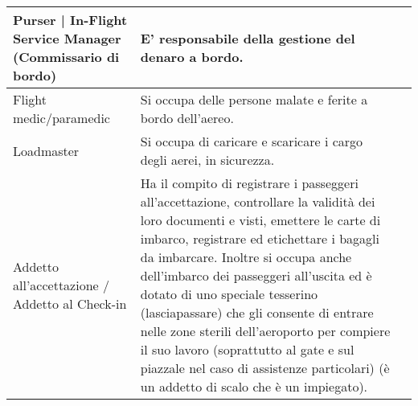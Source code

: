 \begin{landscape}
\begin{table}[htp]
{\begin{tabular}{p{}p{}p{}}
			\hline
			\textsf{\small Purser | In-Flight Service Manager (Commissario di bordo)} & \textsf{\small E' responsabile della gestione del denaro a bordo. } & \textsf{\small } \\
			\hline
			\textsf{\small Flight medic/paramedic} & \textsf{\small Si occupa delle persone malate e ferite a bordo dell'aereo.} & \textsf{\small } \\
			\hline
			\textsf{\small Loadmaster} & \textsf{\small Si occupa di caricare e scaricare i cargo degli aerei, in sicurezza.} & \textsf{\small } \\
			\hline
			\textsf{\small Addetto all'accettazione / Addetto al Check-in} & \textsf{\small Ha il compito di registrare i passeggeri all'accettazione, controllare la validità dei loro documenti e visti, emettere le carte di imbarco, registrare ed etichettare i bagagli da imbarcare. Inoltre si occupa anche dell'imbarco dei passeggeri all'uscita ed è dotato di uno speciale tesserino (lasciapassare) che gli consente di entrare nelle zone sterili dell'aeroporto per compiere il suo lavoro (soprattutto al gate e sul piazzale nel caso di assistenze particolari) (è un addetto di scalo che è un impiegato).} & \textsf{\small } \\
			\hline
		\end{tabular}%
	}%
\end{table}
\end{landscape}


\newpage

